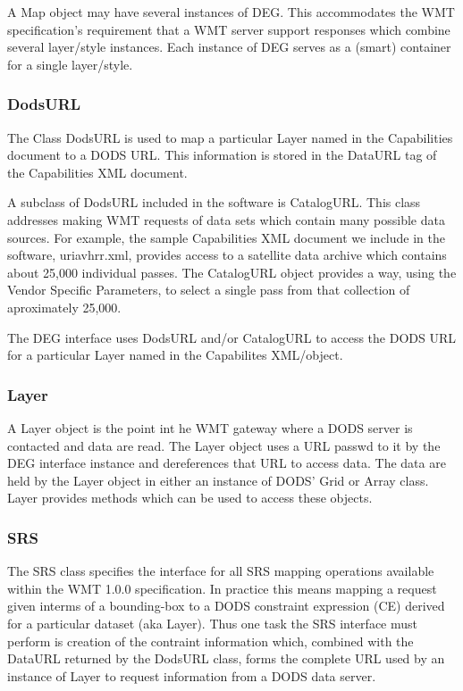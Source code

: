 \documentclass{article}
\begin{document}
A Map object may have several instances of DEG. This accommodates the WMT
specification's requirement that a WMT server support responses which combine
several layer/style instances. Each instance of DEG serves as a (smart)
container for a single layer/style.

\subsubsection{DodsURL}
\label{dodsurl}

The Class DodsURL is used to map a particular Layer named in the Capabilities
document to a DODS URL. This information is stored in the DataURL tag of the
Capabilities XML document.

A subclass of DodsURL included in the software is CatalogURL. This class
addresses making WMT requests of data sets which contain many possible data
sources. For example, the sample Capabilities XML document we include in the
software, uriavhrr.xml, provides access to a satellite data archive which
contains about 25,000 individual passes. The CatalogURL object provides a
way, using the Vendor Specific Parameters, to select a single pass from that
collection of aproximately 25,000.

The DEG interface uses DodsURL and/or CatalogURL to access the DODS URL for a
particular Layer named in the Capabilites XML/object.

\subsubsection{Layer}

A Layer object is the point int he WMT gateway where a DODS server is
contacted and data are read. The Layer object uses a URL passwd to it by the
DEG interface instance and dereferences that URL to access data. The data are
held by the Layer object in either an instance of DODS' Grid or Array class.
Layer provides methods which can be used to access these objects.

\subsubsection{SRS}

The SRS class specifies the interface for all SRS mapping operations
available within the WMT 1.0.0 specification. In practice this means mapping
a request given interms of a bounding-box to a DODS constraint expression
(CE) derived for a particular dataset (aka Layer). Thus one task the SRS
interface must perform is creation of the contraint information which,
combined with the DataURL returned by the DodsURL class, forms the complete
URL used by an instance of Layer to request information from a DODS data
server. 
\end{document}
